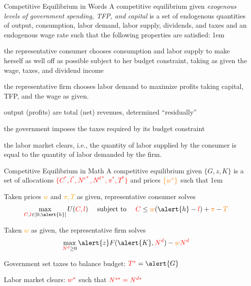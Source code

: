 \documentclass[11pt,aspectratio=43]{beamer}
\newcommand{\orange}[1]{\textcolor{orange}{#1}}
\newcommand{\red}[1]{\textcolor{red}{#1}}
\let\oldenumerate=\enumerate
\let\endoldenumerate=\endenumerate
\renewenvironment{enumerate}{\oldenumerate \itemsep1em}{ \endoldenumerate}
\theoremstyle{definition}
\begin{document}
\begin{frame}{Competitive Equilibrium in Words}
\label{slide:Competitive_Equilibrium_in_Words}
    \footnotesize
    A competitive equilibrium given \textit{exogenous levels of government spending, TFP, and capital} is a set of \alert{endogenous quantities of output, consumption, labor demand, labor supply, dividends, and taxes and an endogenous wage rate} such that the following properties are satisfied:
    \begin{enumerate}
        \item the representative consumer chooses \alert{consumption and labor supply} to make herself as well off as possible subject to her budget constraint, taking as \alert{given the wage, taxes, and dividend income}
        \item the representative firm chooses \alert{labor demand} to maximize profits taking \alert{capital, TFP, and the wage as given}.
        \item output (profits) are total (net) revenues, determined ``residually''
        \item the government imposes the \alert{taxes} required by its budget constraint
        \item the \alert{labor market clears}, i.e., the quantity of labor supplied by the consumer is equal to the quantity of labor demanded by the firm.
    \end{enumerate}
\end{frame}

\begin{frame}{Competitive Equilibrium in Math}
\label{slide:Competitive_Equilibrium_in_Math}
    A \alert{competitive equilibrium} given \alert{$ \{ G, z, K \} $} is a set of allocations \red{$ \{ C^{*}, l^{*}, N^{s*}, N^{d*}, \pi^{*}, T^{*} \}$} and prices $ \orange{\{ w^{*} \}} $ such that
    \begin{enumerate}
        \item Taken prices \orange{$w$} and \orange{$\pi, T$} as given, representative consumer solves
        \begin{equation}
        \label{eq:consumer_problem}
            \max_{\red{C}, \red{l} \in [ 0, \alert{h} ]} U( \red{C, l} ) \quad \text{ subject to } \quad \red{C} \le \orange{w} ( \alert{h} - \red{l} ) + \orange{\pi} - \orange{T}
        \end{equation}
        \item Taken \orange{$w$} as given, the representative firm solves
        \begin{equation}
        \label{eq:firm_problem}
            \max_{\red{N^{d}} \ge 0} \alert{z} F( \alert{K}, \red{N^{d}} ) - \orange{w} \red{N^{d}}
        \end{equation}
        \item Government set taxes to balance budget: $ \red{T^{*}} = \alert{G} $
        \item Labor market clears: $ \red{w^{*}} $ such that $ \red{N^{s*} = N^{d*}} $
    \end{enumerate}
\end{frame}
\end{document}
